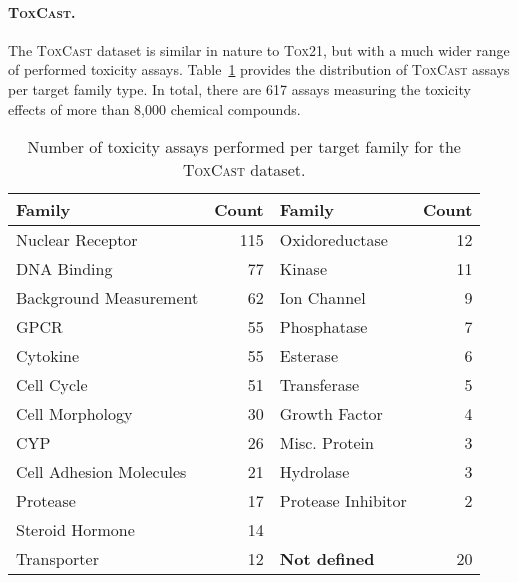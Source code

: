 \documentclass[11pt,a4paper]{article}
\begin{document}
\paragraph{\textsc{ToxCast.}}The \textsc{ToxCast} dataset is similar in nature to \textsc{Tox21}, but with a much wider range 
of performed toxicity assays. 
Table~\ref{tab:toxcast_assays} provides the distribution of \textsc{ToxCast} assays per target 
family type. In total, there are 617 assays measuring the toxicity effects of more than 8,000 
chemical compounds.   

\begin{table}[ht]
\begin{center}
\begin{tabular}{lrlr}\toprule
  {Family}                  & {Count} & {Family}             & {Count} \\ \midrule
  {Nuclear Receptor}        & 115     & {Oxidoreductase}     & 12 \\
  {DNA Binding}             & 77      & {Kinase}             & 11 \\
  {Background Measurement}  & 62      & {Ion Channel}        & 9\\
  {GPCR}                    & 55      & {Phosphatase}        & 7\\
  {Cytokine}                & 55      & {Esterase}           & 6\\
  {Cell Cycle}              & 51      & {Transferase}        & 5\\
  {Cell Morphology}         & 30      & {Growth Factor}      & 4\\
  {CYP}                     & 26      & {Misc. Protein}      & 3\\
  {Cell Adhesion Molecules} & 21      & {Hydrolase}          & 3\\
  {Protease}                & 17      & {Protease Inhibitor} & 2\\
  {Steroid Hormone}         & 14      & & \\
  {Transporter}             & 12      & {\textbf{Not defined}}& 20\\
  \bottomrule
\end{tabular}
\end{center}
\caption{Number of toxicity assays performed per target family for the \textsc{ToxCast} dataset.
         \label{tab:toxcast_assays}} 
\end{table}
\end{document}
